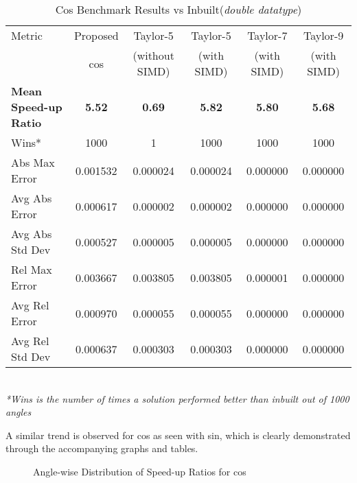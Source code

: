 \documentclass[12pt,twoside, letterpaper, margin=1in]{article}
\begin{document}
\begin{table}[H]
  \centering
  \caption{Cos Benchmark Results vs Inbuilt(\textit{double datatype})}
  \small
  \begin{tabular}{lccccc}
    \toprule
    Metric & Proposed & Taylor-5 & Taylor-5 & Taylor-7 & Taylor-9 \\ 
           &    cos    & (without SIMD) & (with SIMD) & (with SIMD) & (with SIMD) \\
    \midrule
    \textbf{Mean Speed-up Ratio} & \textbf{5.52} & \textbf{0.69} & \textbf{5.82} & \textbf{5.80} & \textbf{5.68} \\
    Wins*                   & 1000   & 1         & 1000       & 1000       & 1000\\
    Abs Max Error          & 0.001532   & 0.000024   & 0.000024   & 0.000000   & 0.000000 \\
    Avg Abs Error          & 0.000617   & 0.000002   & 0.000002   & 0.000000   & 0.000000 \\
    Avg Abs Std Dev        & 0.000527   & 0.000005   & 0.000005   & 0.000000   & 0.000000 \\
    Rel Max Error          & 0.003667   & 0.003805   & 0.003805   & 0.000001   & 0.000000 \\
    Avg Rel Error          & 0.000970   & 0.000055   & 0.000055   & 0.000000   & 0.000000 \\
    Avg Rel Std Dev        & 0.000637   & 0.000303   & 0.000303   & 0.000000   & 0.000000 \\
    \bottomrule
  \end{tabular}
  \vspace{0mm} \\
  \hspace{-1.3cm} {\footnotesize \textit{*Wins is the number of times a solution performed better than inbuilt out of 1000 angles}}
  \label{tab:cosine-transposed}
\end{table}

A similar trend is observed for cos as seen with sin, which is clearly demonstrated through the accompanying graphs and tables.\\


\begin{figure}[H]
    \centering
    \hfill
    \caption{Angle-wise Distribution of Speed-up Ratios for cos}
\end{figure}
\end{document}
